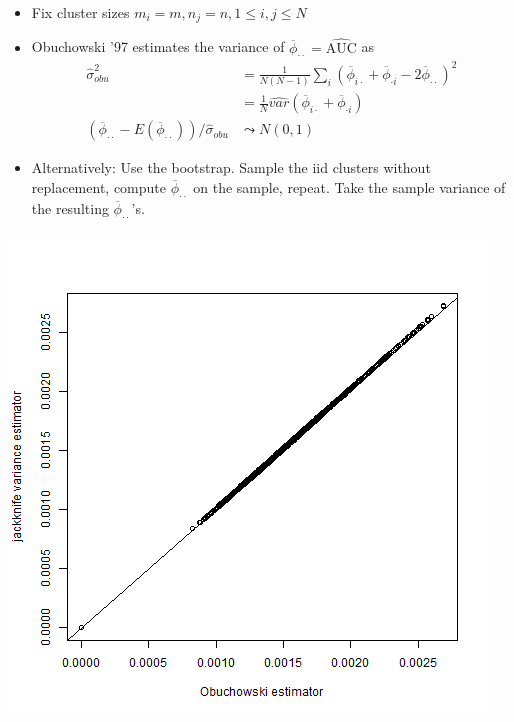 \documentclass{beamer}
\newcommand{\E}{E}
\newcommand{\I}{N}
\newcommand{\rowmean}[1]{\overline{\phi}_{#1\cdot}}
\newcommand{\colmean}[1]{\overline{\phi}_{\cdot #1}}
\newcommand{\auchat}{\overline{\phi}_{\cdot \cdot}}
\begin{document}
 \begin{frame}
   \begin{itemize}
 \item Fix cluster sizes $m_i=m,n_j=n,1\le i,j \le \I$
   
 \item   Obuchowski '97 estimates the variance of $\auchat=\widehat{\text{AUC}}$ as
  \begin{align}
   \hat\sigma^2_{obu}&=\frac{1}{\I(\I-1)}\sum_i(\rowmean{i}+\colmean{i}-2\auchat)^2\\
                     &=\frac{1}{\I}\widehat{var}(\rowmean{i}+\colmean{i})\\
  (\auchat-\E(\auchat))/\hat\sigma_{obu} &\leadsto N(0,1)
  \end{align}
   \item Alternatively: Use the bootstrap. Sample the iid
   clusters without replacement, compute $\auchat$ on the sample,
   repeat. Take the sample variance of the resulting $\auchat$'s.
 \end{itemize}
\end{frame}
\begin{frame}
  \centering
  \includegraphics[scale=.5]{fig9.png}
\end{frame}
\end{document}

